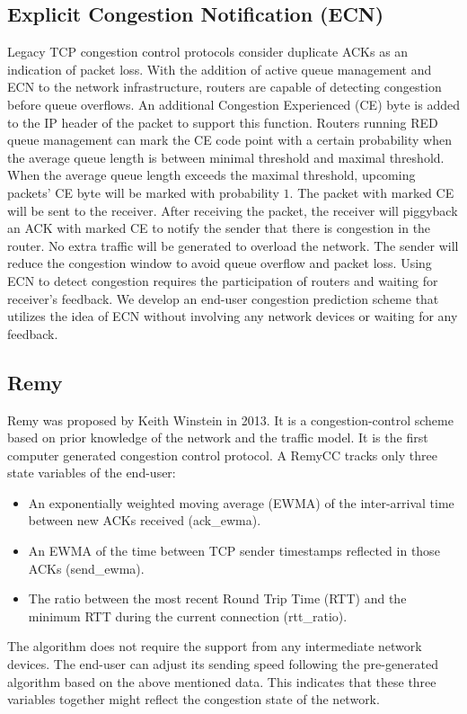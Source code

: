 \subsection{Explicit Congestion Notification (ECN)}
\par Legacy TCP congestion control protocols consider duplicate ACKs as an indication of packet loss. With the addition of active queue management and ECN \cite{ramakrishnan2001rfc} to the network infrastructure, routers are capable of detecting congestion before queue overflows. An additional Congestion Experienced (CE) byte is added to the IP header of the packet to support this function. Routers running RED queue management can mark the CE code point with a certain probability when the average queue length is between minimal threshold and maximal threshold. When the average queue length exceeds the maximal threshold, upcoming packets' CE byte will be marked with probability $1$. The packet with marked CE will be sent to the receiver. After receiving the packet, the receiver will piggyback an ACK with marked CE to notify the sender that there is congestion in the router. No extra traffic will be generated to overload the network. The sender will reduce the congestion window to avoid queue overflow and packet loss. Using ECN to detect congestion requires the participation of routers and waiting for receiver's feedback. We develop an end-user congestion prediction scheme that utilizes the idea of ECN without involving any network devices or waiting for any feedback.
\subsection{Remy}
\par Remy \cite{winstein2013tcp} was proposed by Keith Winstein in 2013. It is a congestion-control scheme based on prior knowledge of the network and the traffic model. It is the first computer generated congestion control protocol. A RemyCC tracks only three state variables of the end-user:
\begin{itemize}
\item An exponentially weighted moving average (EWMA) of the inter-arrival time between new ACKs received (ack\_ewma).
\item An EWMA of the time between TCP sender timestamps reflected in those ACKs (send\_ewma).
\item The ratio between the most recent Round Trip Time (RTT) and the minimum RTT during the current connection (rtt\_ratio).
\end{itemize}
The algorithm does not require the support from any intermediate network devices. The end-user can adjust its sending speed following the pre-generated algorithm based on the above mentioned data. This indicates that these three variables together might reflect the congestion state of the network. 


